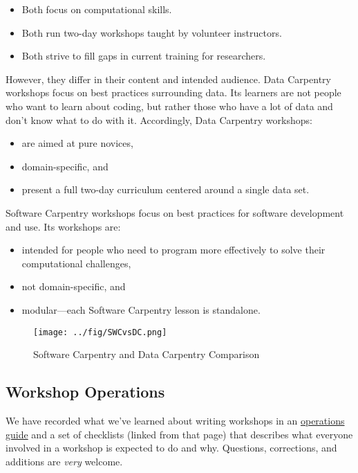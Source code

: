 \begin{itemize}
\item
  Both focus on computational skills.
\item
  Both run two-day workshops taught by volunteer instructors.
\item
  Both strive to fill gaps in current training for researchers.
\end{itemize}

However, they differ in their content and intended audience. Data
Carpentry workshops focus on best practices surrounding data. Its
learners are not people who want to learn about coding, but rather those
who have a lot of data and don't know what to do with it. Accordingly,
Data Carpentry workshops:

\begin{itemize}
\item
  are aimed at pure novices,
\item
  domain-specific, and
\item
  present a full two-day curriculum centered around a single data set.
\end{itemize}

Software Carpentry workshops focus on best practices for software
development and use. Its workshops are:

\begin{itemize}
\item
  intended for people who need to program more effectively to solve
  their computational challenges,
\item
  not domain-specific, and
\item
  modular---each Software Carpentry lesson is standalone.
\end{itemize}

\begin{figure}[htbp]
\centering
\texttt{[image: ../fig/SWCvsDC.png]}
\caption{Software Carpentry and Data Carpentry Comparison}
\end{figure}

\subsection{Workshop Operations}\label{workshop-operations}

We have recorded what we've learned about writing workshops in an
\href{http://software-carpentry.org/workshops/operations/}{operations
guide} and a set of checklists (linked from that page) that describes
what everyone involved in a workshop is expected to do and why.
Questions, corrections, and additions are \emph{very} welcome.

